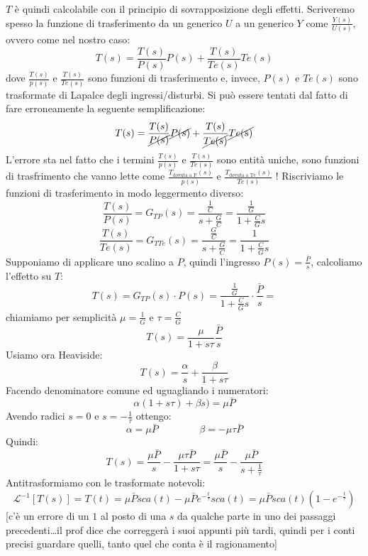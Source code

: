 $T$ è quindi calcolabile con il principio di sovrapposizione degli effetti.\newline
Scriveremo spesso la funzione di trasferimento da un generico $U$ a un generico $Y$ come $\frac{Y(s)}{U(s)}$, ovvero come nel nostro caso:
\[
    T(s) = \frac{T(s)}{P(s)}P(s) + \frac{T(s)}{Te(s)}Te(s)
\]
dove $\frac{T(s)}{p(s)}$ e $\frac{T(s)}{Te(s)}$ sono funzioni di trasferimento e, invece, $P(s)$ e $Te(s)$ sono trasformate di Lapalce degli ingressi/disturbi.\newline
Si può essere tentati dal fatto di fare erroneamente la seguente semplificazione:
\[
    T(s) = \frac{T(s)}{\cancel{P(s)}}\cancel{P(s)} + \frac{T(s)}{\cancel{Te(s)}}\cancel{Te(s)}
\]
L'errore sta nel fatto che i termini $\frac{T(s)}{p(s)}$ e $\frac{T(s)}{Te(s)}$ sono entità uniche, sono funzioni di trasfrimento che vanno lette come $\frac{T_{\text{dovuta a P}}(s)}{p(s)}$ e $\frac{T_{\text{dovuta a Te}}(s)}{Te(s)}$ !\newline
\newline
Riscriviamo le funzioni di trasferimento in modo leggermento diverso:
\[
    \frac{T(s)}{P(s)} = G_{TP}(s)= \frac{\frac{1}{C}}{s + \frac{G}{C}} = \frac{\frac{1}{G}}{1 + \frac{C}{G}s}
\]
\[
    \frac{T(s)}{Te(s)} = G_{TTe}(s) = \frac{\frac{G}{C}}{s+ \frac{G}{C}} = \frac{1}{1 + \frac{C}{G}s}
\]
Supponiamo di applicare uno scalino a $P$, quindi l'ingresso $P(s) = \frac{\bar{P}}{s}$, calcoliamo l'effetto su $T$:
\[
    T(s) = G_{TP}(s) \cdot P(s) = \frac{\frac{1}{G}}{1 + \frac{C}{G}s} \cdot  \frac{\bar{P}}{s} = 
\]
chiamiamo per semplicità $\mu = \frac{1}{G}$ e $\tau = \frac{C}{G}$ 
\[
    T(s) = \frac{\mu}{1 + s \tau} \frac{\bar{P}}{s}
\]
Usiamo ora Heaviside:
\[
    T(s) = \frac{\alpha}{s} + \frac{\beta}{1 + s \tau}
\]
Facendo denominatore comune ed uguagliando i numeratori:
\[
    \alpha(1 + s \tau) + \beta s ) = \mu \bar{P}
\]
Avendo radici $s= 0$ e $ s= - \frac{1}{\tau}$ ottengo:
\[
    \alpha = \mu \bar{P} \;\;\;\;\;\;\;\;\;\;\;\;\;\;\;\beta=-\mu \tau \bar{P}
\]
Quindi:
\[
    T(s) = \frac{\mu \bar{P}}{s} - \frac{\mu \tau \bar{P}}{1 + s \tau} = \frac{\mu \bar{P}}{s} - \frac{\mu \bar{P}}{s + \frac{1}{\tau}}
\]
Antitrasformiamo con le trasformate notevoli:
\[
    \mathcal{L}^{-1}[T(s)] = T(t) = \mu \bar{P} sca(t) - \mu \bar{P} e^{-\frac{t}{\tau}} sca(t) = \mu \bar{P} sca(t) (1- e^{- \frac{t}{\tau}})
\]
[c'è un errore di un $1$ al posto di una $s$ da qualche parte in uno dei passaggi precedenti\dots il prof dice che correggerà i suoi appunti più tardi, quindi per i conti precisi guardare quelli, tanto quel che conta è il ragionamento]\newline
